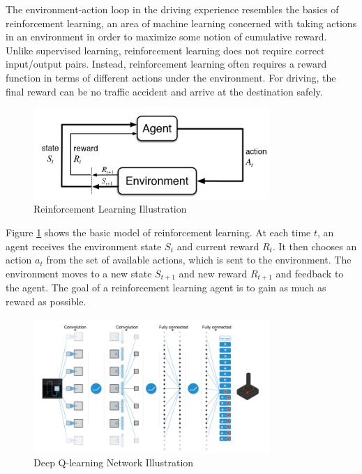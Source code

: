 \documentclass[a4paper]{article}
\begin{document}
The environment-action loop in the driving experience resembles the basics of reinforcement learning, an area of machine learning concerned with taking actions in an environment in order to maximize some notion of cumulative reward. Unlike supervised learning, reinforcement learning does not require correct input/output pairs. Instead, reinforcement learning often requires a reward function in terms of different actions under the environment. For driving, the final reward can be no traffic accident and arrive at the destination safely.

\begin{figure}
    \centering
    \includegraphics[width=0.8\textwidth]{./figures/rl.png}
    \caption{ Reinforcement Learning Illustration}
    \label{fig:RL}
\end{figure}


Figure \ref{fig:RL} shows the basic model of reinforcement learning. At each time $t$, an agent receives the environment state $S_t$ and current reward $R_t$. It then chooses an action $a_t$ from the set of available actions, which is sent to the environment. The environment moves to a new state $S_{t+1}$ and new reward $R_{t+1}$ and feedback to the agent. The goal of a reinforcement learning agent is to gain as much as reward as possible.


\begin{figure}
	\centering
	\includegraphics[width=0.8\textwidth]{./figures/deepq.png}
	\caption{ Deep Q-learning Network Illustration}
	\label{fig:deepq}
\end{figure}
\end{document}

